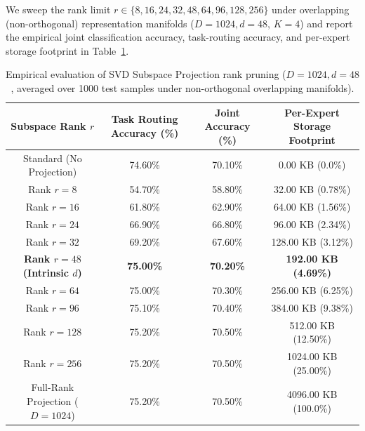 \documentclass{article}
\theoremstyle{plain}
\theoremstyle{definition}
\theoremstyle{remark}
\begin{document}
We sweep the rank limit $r \in \{8, 16, 24, 32, 48, 64, 96, 128, 256\}$ under overlapping (non-orthogonal) representation manifolds ($D=1024, d=48$, $K=4$) and report the empirical joint classification accuracy, task-routing accuracy, and per-expert storage footprint in Table~\ref{tab:svd_rank_sweep}.

\begin{table}[htbp]
\centering
\caption{Empirical evaluation of SVD Subspace Projection rank pruning ($D=1024, d=48$, averaged over 1000 test samples under non-orthogonal overlapping manifolds).}
\label{tab:svd_rank_sweep}
\vskip 0.15in
\setlength{\tabcolsep}{3pt}
\small
\begin{tabular}{cccc}
\toprule
Subspace Rank $r$ & Task Routing Accuracy (\%) & Joint Accuracy (\%) & Per-Expert Storage Footprint \\
\midrule
Standard (No Projection) & 74.60\% & 70.10\% & 0.00 KB (0.0\%) \\
\midrule
Rank $r=8$   & 54.70\% & 58.80\% & 32.00 KB (0.78\%) \\
Rank $r=16$  & 61.80\% & 62.90\% & 64.00 KB (1.56\%) \\
Rank $r=24$  & 66.90\% & 66.80\% & 96.00 KB (2.34\%) \\
Rank $r=32$  & 69.20\% & 67.60\% & 128.00 KB (3.12\%) \\
\textbf{Rank $r=48$ (Intrinsic $d$)} & \textbf{75.00\%} & \textbf{70.20\%} & \textbf{192.00 KB (4.69\%)} \\
Rank $r=64$  & 75.00\% & 70.30\% & 256.00 KB (6.25\%) \\
Rank $r=96$  & 75.10\% & 70.40\% & 384.00 KB (9.38\%) \\
Rank $r=128$ & 75.20\% & 70.50\% & 512.00 KB (12.50\%) \\
Rank $r=256$ & 75.20\% & 70.50\% & 1024.00 KB (25.00\%) \\
\midrule
Full-Rank Projection ($D=1024$) & 75.20\% & 70.50\% & 4096.00 KB (100.0\%) \\
\bottomrule
\end{tabular}
\end{table}
\end{document}
